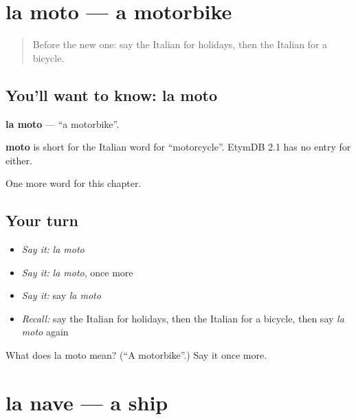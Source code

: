 \section[la moto]{la moto — a motorbike}

\label{lesson:IT-C93-moto}



\begin{quote}
Before the new one: say the Italian for holidays, then the Italian for a bicycle.
\end{quote}

\subsection*{You'll want to know: la moto}
\textbf{la moto} — \textquotedblleft{}a motorbike\textquotedblright{}.

\begin{cousinweb}
\textbf{moto} is short for the Italian word for \textquotedblleft{}motorcycle\textquotedblright{}. EtymDB 2.1 has no entry for either.
\end{cousinweb}

\begin{grammarlens}[title={What you've built}]
One more word for this chapter.
\end{grammarlens}

\subsection*{Your turn}
\begin{itemize}
\raggedright
  \item \emph{Say it:} \emph{la moto}
  \item \emph{Say it:} \emph{la moto}, once more
  \item \emph{Say it:} say \emph{la moto}
  \item \emph{Recall:} say the Italian for holidays, then the Italian for a bicycle, then say \emph{la moto} again
\end{itemize}

\begin{tcolorbox}[breakable,colback=teal!4,colframe=teal!35!black,title={Before you move on}]
What does la moto mean? (\textquotedblleft{}A motorbike\textquotedblright{}.) Say it once more.
\end{tcolorbox}
\section[la nave]{la nave — a ship}

